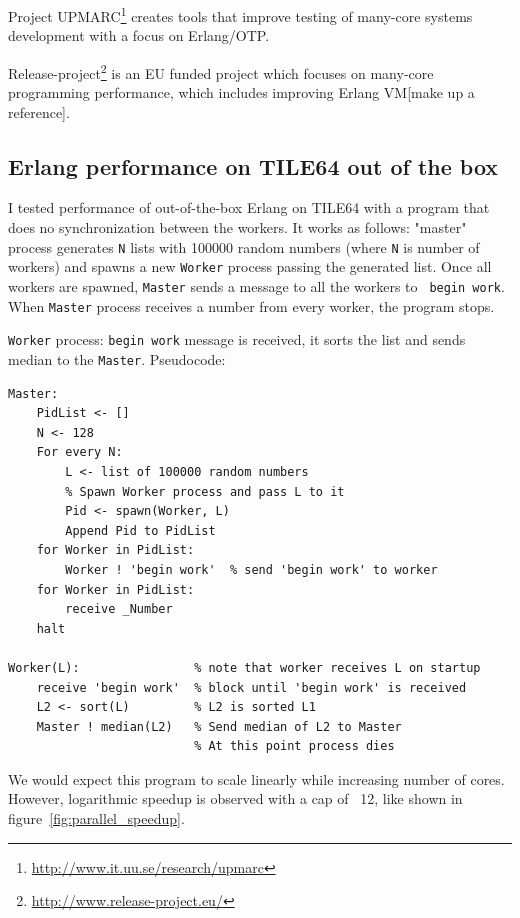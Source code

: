 \documentclass[english,11pt]{article}
\begin{document}
Project UPMARC\footnote{\url{http://www.it.uu.se/research/upmarc}} creates tools
that improve testing of many-core systems development with a focus on
Erlang/OTP.

Release-project\footnote{\url{http://www.release-project.eu/}} is an EU funded
project which focuses on many-core programming performance, which includes
improving Erlang VM[make up a reference].

\subsection{Erlang performance on TILE64 out of the box}

I tested performance of out-of-the-box Erlang on TILE64 with a program that does
no synchronization between the workers. It works as follows: "master" process
generates {\tt N} lists with 100000 random numbers (where {\tt N} is number of
workers) and spawns a new {\tt Worker} process passing the generated list. Once
all workers are spawned, {\tt Master} sends a message to all the workers to {\tt
begin work}. When {\tt Master} process receives a number from every worker, the
program stops.

{\tt Worker} process: {\tt begin work} message is received, it sorts the list
and sends median to the {\tt Master}. Pseudocode:

\begin{verbatim}
Master:
    PidList <- []
    N <- 128
    For every N:
        L <- list of 100000 random numbers
        % Spawn Worker process and pass L to it
        Pid <- spawn(Worker, L)
        Append Pid to PidList
    for Worker in PidList:
        Worker ! 'begin work'  % send 'begin work' to worker
    for Worker in PidList:
        receive _Number
    halt

Worker(L):                % note that worker receives L on startup
    receive 'begin work'  % block until 'begin work' is received
    L2 <- sort(L)         % L2 is sorted L1
    Master ! median(L2)   % Send median of L2 to Master
                          % At this point process dies
\end{verbatim}

We would expect this program to scale linearly while increasing number of
cores. However, logarithmic speedup is observed with a cap of ~12, like shown
in figure~\ref{fig:parallel_speedup}.
\end{document}
